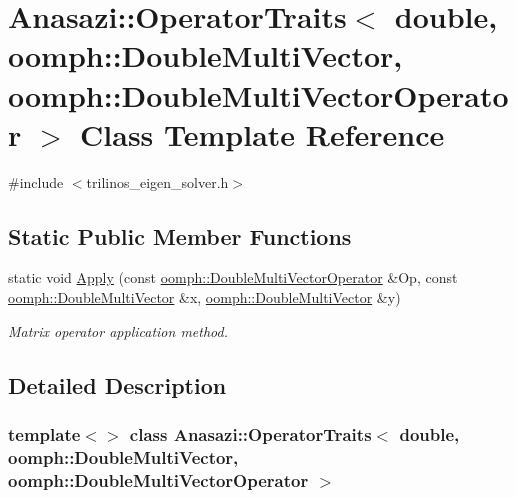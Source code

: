 \hypertarget{classAnasazi_1_1OperatorTraits_3_01double_00_01oomph_1_1DoubleMultiVector_00_01oomph_1_1DoubleMultiVectorOperator_01_4}{}\section{Anasazi\+:\+:Operator\+Traits$<$ double, oomph\+:\+:Double\+Multi\+Vector, oomph\+:\+:Double\+Multi\+Vector\+Operator $>$ Class Template Reference}
\label{classAnasazi_1_1OperatorTraits_3_01double_00_01oomph_1_1DoubleMultiVector_00_01oomph_1_1DoubleMultiVectorOperator_01_4}


{\ttfamily \#include $<$trilinos\+\_\+eigen\+\_\+solver.\+h$>$}

\subsection*{Static Public Member Functions}
\begin{DoxyCompactItemize}
\item 
static void \hyperlink{classAnasazi_1_1OperatorTraits_3_01double_00_01oomph_1_1DoubleMultiVector_00_01oomph_1_1DoubleMultiVectorOperator_01_4_a08de8f353951f165e291a6074d8aea99}{Apply} (const \hyperlink{classoomph_1_1DoubleMultiVectorOperator}{oomph\+::\+Double\+Multi\+Vector\+Operator} \&Op, const \hyperlink{classoomph_1_1DoubleMultiVector}{oomph\+::\+Double\+Multi\+Vector} \&x, \hyperlink{classoomph_1_1DoubleMultiVector}{oomph\+::\+Double\+Multi\+Vector} \&y)
\begin{DoxyCompactList}\small\item\em Matrix operator application method. \end{DoxyCompactList}\end{DoxyCompactItemize}


\subsection{Detailed Description}
\subsubsection*{template$<$$>$\newline
class Anasazi\+::\+Operator\+Traits$<$ double, oomph\+::\+Double\+Multi\+Vector, oomph\+::\+Double\+Multi\+Vector\+Operator $>$}

